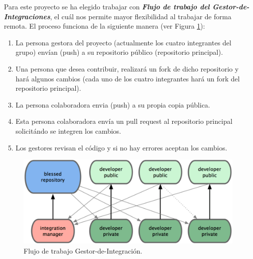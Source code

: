 Para este proyecto se ha elegido trabajar con \textbf{\textit{Flujo de trabajo del Gestor-de-Integraciones}}, el cuál nos permite mayor flexibilidad al trabajar de forma remota.  El proceso funciona de la siguiente manera (ver Figura \ref{git_integracion}):
	\begin{enumerate}
		\item    La persona gestora del proyecto (actualmente los cuatro integrantes del grupo) envían (push) a su repositorio público (repositorio principal).
		\item    Una persona que desea contribuir, realizará un fork de dicho repositorio y hará algunos cambios (cada uno de los cuatro integrantes hará un fork del repositorio principal).
		\item    La persona colaboradora envia (push) a su propia copia pública.
		\item    Esta persona colaboradora envía un pull request al repositorio principal solicitándo se integren los cambios.
		\item    Los gestores revisan el código y si no hay errores aceptan los cambios.
	\end{enumerate}
\begin{figure}
  \centering
  \includegraphics[width=.8\textwidth]{img/tp2_definicion/git_integracion}
  \caption{Flujo de trabajo Gestor-de-Integración.}
  \label{git_integracion}
\end{figure}


